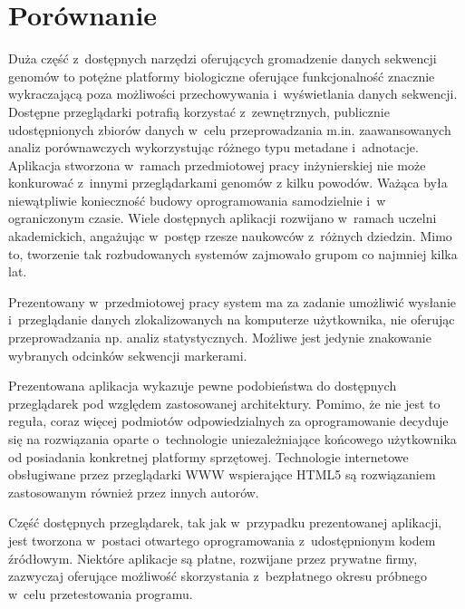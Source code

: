 \documentclass[a4paper,12pt,oneside]{mwrep}  %
\begin{document}
\section{Porównanie}
Duża część z~dostępnych narzędzi oferujących gromadzenie danych sekwencji genomów to potężne platformy biologiczne oferujące funkcjonalność znacznie wykraczającą poza możliwości przechowywania i~wyświetlania danych sekwencji. Dostępne przeglądarki potrafią korzystać z~zewnętrznych, publicznie udostępnionych zbiorów danych w~celu przeprowadzania m.in. zaawansowanych analiz porównawczych wykorzystując różnego typu metadane i~adnotacje.
Aplikacja stworzona w~ramach przedmiotowej pracy inżynierskiej nie może konkurować z~innymi przeglądarkami genomów 
z kilku powodów.
Ważąca była niewątpliwie konieczność budowy oprogramowania samodzielnie i~w ograniczonym czasie. Wiele dostępnych aplikacji rozwijano w~ramach uczelni akademickich, angażując w~postęp rzesze naukowców z~różnych dziedzin. Mimo to, tworzenie tak rozbudowanych systemów zajmowało grupom co najmniej kilka lat.

Prezentowany w~przedmiotowej pracy system ma za zadanie umożliwić wysłanie i~przeglądanie danych zlokalizowanych na komputerze użytkownika, nie oferując przeprowadzania np. analiz statystycznych. Możliwe jest jedynie znakowanie wybranych odcinków sekwencji markerami.  

Prezentowana aplikacja wykazuje pewne podobieństwa do dostępnych przeglądarek pod względem zastosowanej architektury. Pomimo, że nie jest to reguła, coraz więcej podmiotów odpowiedzialnych za oprogramowanie decyduje się na rozwiązania oparte o~technologie uniezależniające końcowego użytkownika od posiadania konkretnej platformy sprzętowej. Technologie internetowe obsługiwane przez przeglądarki WWW wspierające HTML5 są rozwiązaniem zastosowanym również przez innych autorów.

Część dostępnych przeglądarek, tak jak w~przypadku prezentowanej aplikacji, jest tworzona w~postaci otwartego oprogramowania z~udostępnionym kodem źródłowym. Niektóre aplikacje są płatne, rozwijane przez prywatne firmy, zazwyczaj oferujące możliwość skorzystania z~bezpłatnego okresu próbnego w~celu przetestowania programu.
\end{document}
